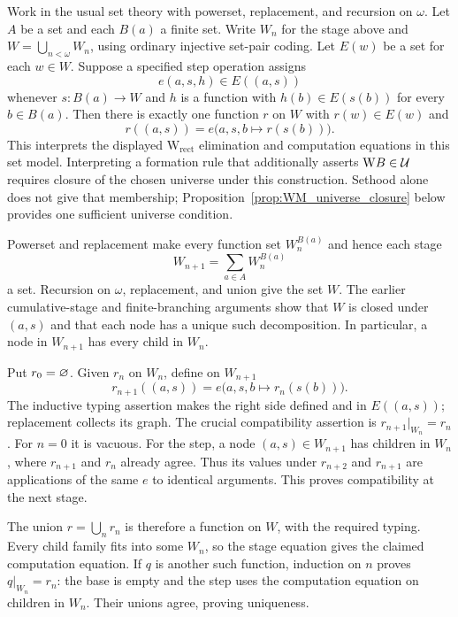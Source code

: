 \begin{theorem}
\label{thm:Wcomp}
Work in the usual set theory with powerset, replacement, and recursion on
$\omega$. Let $A$ be a set and each $B(a)$ a finite set. Write $W_n$ for
the stage above and $W=\bigcup_{n<\omega}W_n$, using ordinary injective
set-pair coding. Let $E(w)$ be a set for each $w\in W$. Suppose a
specified step operation assigns
\[
e(a,s,h)\in E((a,s))
\]
whenever $s:B(a)\to W$ and $h$ is a function with
$h(b)\in E(s(b))$ for every $b\in B(a)$. Then there is exactly one
function $r$ on $W$ with $r(w)\in E(w)$ and
\[
r((a,s))=e\bigl(a,s,b\mapsto r(s(b))\bigr).
\]
This interprets the displayed $\mathrm W_{\mathrm{rect}}$ elimination
and computation equations in this set model. Interpreting a formation
rule that additionally asserts $\mathrm WB\in\mathcal{U}$ requires closure of
the chosen universe under this construction. Sethood alone does not
give that membership; Proposition~\ref{prop:WM_universe_closure} below
provides one sufficient universe condition.
\end{theorem}
\Proof
Powerset and replacement make every function set $W_n^{B(a)}$ and
hence each stage
\[
W_{n+1}=\sum_{a\in A}W_n^{B(a)}
\]
a set.
Recursion on $\omega$, replacement, and union give the set $W$.
The earlier cumulative-stage and finite-branching arguments show that
$W$ is closed under $(a,s)$ and that each node has a unique such
decomposition. In particular, a node in $W_{n+1}$ has every child in
$W_n$.

Put $r_0=\varnothing$. Given $r_n$ on $W_n$, define on $W_{n+1}$
\[
r_{n+1}((a,s))=e\bigl(a,s,b\mapsto r_n(s(b))\bigr).
\]
The inductive typing assertion makes the right side defined and in
$E((a,s))$; replacement collects its graph. The crucial compatibility
assertion is $r_{n+1}|_{W_n}=r_n$. For $n=0$ it is vacuous. For the
step, a node $(a,s)\in W_{n+1}$ has children in $W_n$, where
$r_{n+1}$ and $r_n$ already agree. Thus its values under $r_{n+2}$
and $r_{n+1}$ are applications of the same $e$ to identical arguments.
This proves compatibility at the next stage.

The union $r=\bigcup_n r_n$ is therefore a function on $W$, with the
required typing. Every child family fits into some $W_n$, so the
stage equation gives the claimed computation equation. If $q$ is
another such function, induction on $n$ proves $q|_{W_n}=r_n$:
the base is empty and the step uses the computation equation on
children in $W_n$. Their unions agree, proving uniqueness.
\Done

